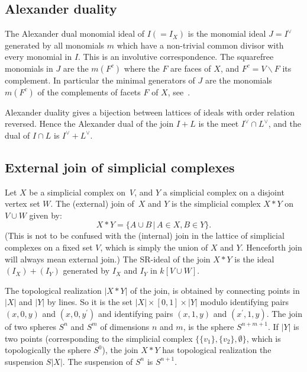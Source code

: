 \documentclass[10pt,a4paper]{article}
\theoremstyle{definition}
\theoremstyle{remark}
\theoremstyle{plain}
\begin{document}
\subsection{Alexander duality}
\label{subsec:AD}
The Alexander dual monomial ideal of $I (=I_X)$
is the monomial ideal $J = I^\vee$ generated
by all monomials $m$ which have a non-trivial common divisor with every monomial
in $I$. This is an involutive correspondence. The
squarefree monomials in $J$ are the $m(F^c)$ where the $F$ are faces
of $X$, and $F^c = V \backslash F$ its complement. In particular the
minimal generators
of $J$ are the monomials $m(F^c)$ of the complements of facets $F$
of $X$, see~\cite[Lemma 1.5.3]{HeHi}.

Alexander duality gives a bijection between lattices of ideals
with order relation reversed. Hence the Alexander dual of the join
$I + L$ is the meet $I^\vee \cap L^\vee$, and the dual of $I \cap L$ is
$I^\vee + L^\vee$.


\subsection{External join of simplicial complexes}

Let $X$ be a simplicial complex on~$V$, and $Y$ a simplicial complex
on a disjoint vertex set $W$. The (external) join of~$X$ and $Y$ is
the simplicial complex $X * Y$ on $V \cup W$ given by:
\[ X * Y = \{ A \cup B \, | \, A \in X, B \in Y \}. \]
(This is not to be confused with the (internal) join in the lattice
of simplicial
complexes on a fixed set $V$, which is simply the union of $X$ and $Y$.
Henceforth join will always mean external join.)
The SR-ideal of the join $X * Y$ is the ideal
$(I_X) + (I_Y)$ generated by $I_X$ and $I_Y$ in $k[V \cup W]$. 

The topological realization $|X * Y|$ of the join, is obtained by connecting
points
in $|X|$ and $|Y|$ by lines. So it is the set
$|X| \times [0,1] \times |Y|$ modulo identifying pairs
$(x,0,y)$ and $(x,0,y^\prime)$ and identifying pairs
$(x,1,y)$ and $(x^\prime, 1, y)$.
The join of two spheres $S^n$ and $S^{m}$ of dimensions $n$ and $m$,
is the sphere $S^{n+m+1}$. If $|Y|$ is two points (corresponding
to the simplicial complex $\{\{v_1\}, \{v_2\}, \emptyset\}$, which
is topologically the sphere $S^0$), the
join $X * Y$ has topological realization the suspension $S|X|$.
The suspension of $S^n$ is $S^{n+1}$.
\end{document}
